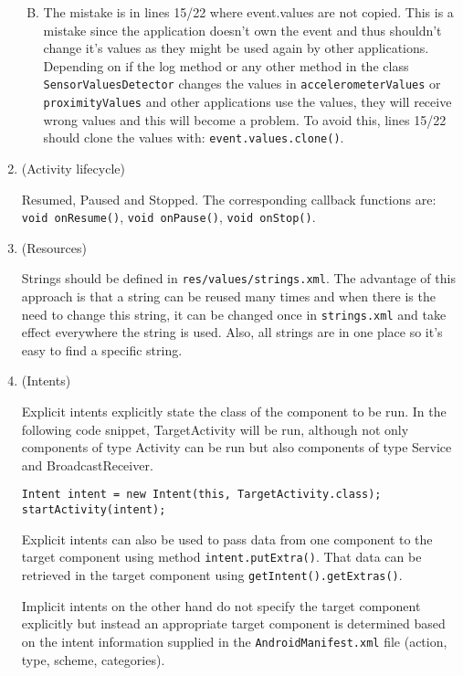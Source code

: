 \documentclass[11pt]{article}
\begin{document}
\begin{enumerate}
\begin{enumerate}[A)]
\begin{enumerate}[a)]
\end{enumerate}

\item
The mistake is in lines 15/22 where event.values are not copied. This is a mistake since the application doesn't own the event and thus shouldn't change it's values as they might be used again by other applications. Depending on if the log method or any other method in the class \lstinline{SensorValuesDetector} changes the values in \lstinline{accelerometerValues} or \lstinline{proximityValues} and other applications use the values, they will receive wrong values and this will become a problem. To avoid this, lines 15/22 should clone the values with: \lstinline{event.values.clone()}.

\end{enumerate}

\item (Activity lifecycle)

Resumed, Paused and Stopped. The corresponding callback functions are:
\lstinline{void onResume()}, \lstinline{void onPause()}, \lstinline{void onStop()}.

\item (Resources)

Strings should be defined in \lstinline{res/values/strings.xml}. The advantage of this approach is that a string can be reused many times and when there is the need to change this string, it can be changed once in \lstinline{strings.xml} and take effect everywhere the string is used. Also, all strings are in one place so it's easy to find a specific string.

\item (Intents)

Explicit intents explicitly state the class of the component to be run. In the following code snippet, TargetActivity will be run, although not only components of type Activity can be run but also components of type Service and BroadcastReceiver.

\begin{lstlisting}
Intent intent = new Intent(this, TargetActivity.class);
startActivity(intent);
\end{lstlisting}

Explicit intents can also be used to pass data from one component to the target component using method \lstinline{intent.putExtra()}. That data can be retrieved in the target component using \lstinline{getIntent().getExtras()}.

Implicit intents on the other hand do not specify the target component explicitly but instead an appropriate target component is determined based on the intent information supplied in the \lstinline{AndroidManifest.xml} file (action, type, scheme, categories).


\end{enumerate}
\end{document}
